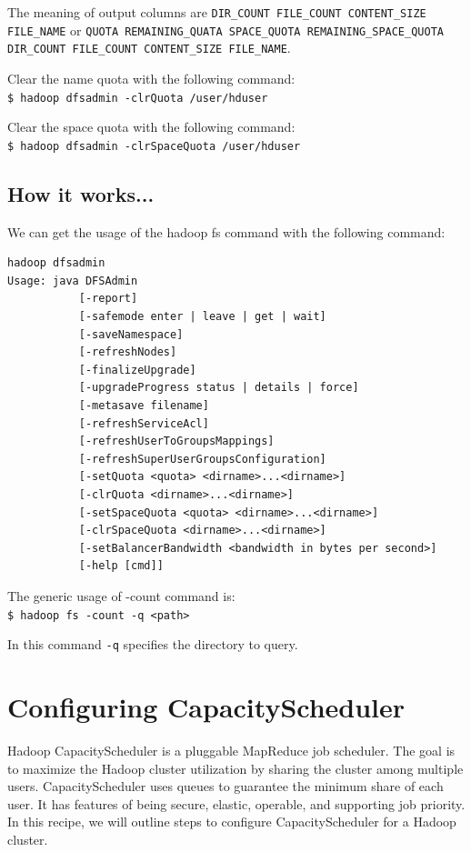 The meaning of output columns are \verb|DIR_COUNT FILE_COUNT CONTENT_SIZE FILE_NAME| or \verb|QUOTA REMAINING_QUATA SPACE_QUOTA REMAINING_SPACE_QUOTA DIR_COUNT FILE_COUNT CONTENT_SIZE FILE_NAME|.

Clear the name quota with the following command: \\
\verb|$ hadoop dfsadmin -clrQuota /user/hduser|

Clear the space quota with the following command: \\
\verb|$ hadoop dfsadmin -clrSpaceQuota /user/hduser|

\subsection*{How it works...}
We can get the usage of the hadoop fs command with the following command:
\begin{verbatim}
hadoop dfsadmin
Usage: java DFSAdmin
           [-report]
           [-safemode enter | leave | get | wait]
           [-saveNamespace]
           [-refreshNodes]
           [-finalizeUpgrade]
           [-upgradeProgress status | details | force]
           [-metasave filename]
           [-refreshServiceAcl]
           [-refreshUserToGroupsMappings]
           [-refreshSuperUserGroupsConfiguration]
           [-setQuota <quota> <dirname>...<dirname>]
           [-clrQuota <dirname>...<dirname>]
           [-setSpaceQuota <quota> <dirname>...<dirname>]
           [-clrSpaceQuota <dirname>...<dirname>]
           [-setBalancerBandwidth <bandwidth in bytes per second>]
           [-help [cmd]]
\end{verbatim}

The generic usage of -count command is: \\
\verb|$ hadoop fs -count -q <path>|

In this command \verb|-q| specifies the directory to query. 

\section{Configuring CapacityScheduler}
Hadoop CapacityScheduler is a pluggable MapReduce job scheduler. The goal is to maximize the Hadoop cluster utilization by sharing the cluster among multiple users. CapacityScheduler uses queues to guarantee the minimum share of each user. It has features of being secure, elastic, operable, and supporting job priority. In this recipe, we will outline steps to configure CapacityScheduler for a Hadoop cluster.

